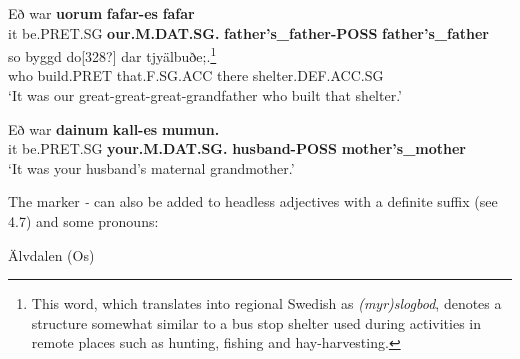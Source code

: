 
 \ea\label{}
\gll Eð  war  \textbf{uorum}\textbf{  fafar-es}\textbf{  fafar}\\


it  be.PRET.SG  \textbf{our.M.DAT.SG.} \textbf{father’s\_father-POSS} \textbf{father’s\_father}\\

 \ea\label{}
\gll so  byggd  do[328?]  dar  tjyälbuðe;.\footnote{ This word, which translates into regional Swedish as\textit{ (myr)slogbod}, denotes a structure somewhat similar to a bus stop shelter used during activities in remote places such as hunting, fishing and hay-harvesting.}\\


who  build.PRET  that.F.SG.ACC  there  shelter.DEF.ACC.SG\\

\glt ‘It was our great-great-great-grandfather who built that shelter.’

\z

\item 


 \ea\label{}
\gll Eð  war  \textbf{dainum}\textbf{  kall-es}\textbf{  mumun.}\\


it  be.PRET.SG  \textbf{your.M.DAT.SG.} \textbf{husband-POSS} \textbf{mother’s\_mother}\\

\glt ‘It was your husband’s maternal grandmother.’

\z

The marker\textit{ {}-} can also be added to headless adjectives with a definite suffix (see 4.7) and some pronouns:


\item 

Älvdalen (Os)  



